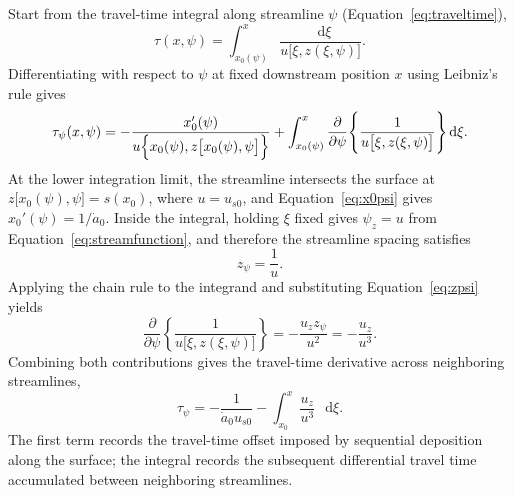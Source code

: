 \documentclass[review]{igs}
\begin{document}
Start from the travel-time integral along streamline \(\psi\) (Equation~\ref{eq:traveltime}),
\begin{equation}
\tau(x,\psi)=\int_{x_0(\psi)}^{x}
\frac{\mathop{}\!\mathrm{d}\xi}{u\bigl[\xi,z(\xi,\psi)\bigr]}.
\end{equation}
Differentiating with respect to \(\psi\) at fixed downstream position \(x\) using Leibniz's rule gives
\begin{equation}
\tau_{\psi}(x,\psi)
=-\frac{x_0'(\psi)}{u\Bigl\{x_0(\psi),z\bigl[x_0(\psi),\psi\bigr]\Bigr\}}
+\int_{x_0(\psi)}^{x}
\frac{\partial}{\partial\psi}\!\left\{\frac{1}{u\bigl[\xi,z(\xi,\psi)\bigr]}\right\}\mathop{}\!\mathrm{d}\xi.
\end{equation}
At the lower integration limit, the streamline intersects the surface at \(z\bigl[x_0(\psi),\psi\bigr]=s(x_0)\), where \(u=u_{s0}\), and Equation~\ref{eq:x0psi} gives \(x_0'(\psi)=1/\dot a_0\). Inside the integral, holding \(\xi\) fixed gives \(\psi_z=u\) from Equation~\ref{eq:streamfunction}, and therefore the streamline spacing satisfies
\begin{equation}
z_{\psi}=\frac{1}{u}.
\label{eq:zpsi}
\end{equation}
Applying the chain rule to the integrand and substituting Equation~\ref{eq:zpsi} yields
\begin{equation}
\frac{\partial}{\partial\psi}\!\left\{\frac{1}{u\bigl[\xi,z(\xi,\psi)\bigr]}\right\}
=-\frac{u_z z_{\psi}}{u^2}
=-\frac{u_z}{u^3}.
\end{equation}
Combining both contributions gives the travel-time derivative across neighboring streamlines,
\begin{equation}
\tau_{\psi}
=-\frac{1}{\dot a_0u_{s0}}
-\int_{x_0}^{x}\frac{u_z}{u^3}\,\mathop{}\!\mathrm{d}\xi.
\label{eq:taupsi}
\end{equation}
The first term records the travel-time offset imposed by sequential deposition along the surface; the integral records the subsequent differential travel time accumulated between neighboring streamlines.
\end{document}

